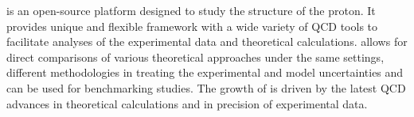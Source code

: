 
\label{sec:summary}
\fitter is an open-source platform designed to study the structure of the proton.
It provides unique and flexible framework with a wide variety of QCD tools to 
facilitate analyses of the experimental data and theoretical calculations. 
\fitter allows for direct comparisons of various theoretical approaches under the same settings, 
different methodologies in treating the experimental and model uncertainties and can be used for benchmarking studies.
The growth of \fitter is driven by the latest QCD advances in theoretical calculations and in precision of experimental data.
%
